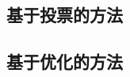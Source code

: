 \subsubsection{}
\subsubsection{}

\subsection{基于投票的方法}\label{基于投票的方法}
\subsection{基于优化的方法}\label{基于优化的方法}

